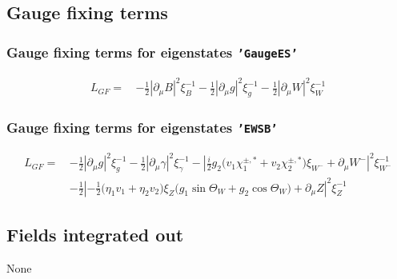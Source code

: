 \subsection{Gauge fixing terms} 
\subsubsection{Gauge fixing terms for eigenstates {\tt 'GaugeES'} } 
\begin{align} 
L_{GF} = \, &-\frac{1}{2} |\partial_{\mu}B|^2 \xi_{B}^{-1}  -\frac{1}{2} |\partial_{\mu}g|^2 \xi_{g}^{-1}  -\frac{1}{2} |\partial_{\mu}W|^2 \xi_{W}^{-1} 
\end{align} 
\subsubsection{Gauge fixing terms for eigenstates {\tt 'EWSB'} } 
\begin{align} 
L_{GF} = \, &-\frac{1}{2} |\partial_{\mu}g|^2 \xi_{g}^{-1} -\frac{1}{2} |\partial_{\mu}\gamma|^2 \xi_{\gamma}^{-1} - |\frac{i}{2} g_2 \Big(v_1 \chi_1^{\pm,*}  + v_2 \chi_2^{\pm,*} \Big)\xi_{W^-}  + \partial_{\mu}W^-|^2 \xi_{W^-}^{-1} \nonumber \\ 
 &-\frac{1}{2} |-\frac{1}{2} \Big(\eta_1 v_1  + \eta_2 v_2 \Big)\xi_{Z} \Big(g_1 \sin\Theta_W   + g_2 \cos\Theta_W  \Big) + \partial_{\mu}Z|^2 \xi_{Z}^{-1} 
\end{align} 
\subsection{Fields integrated out} 
None 
